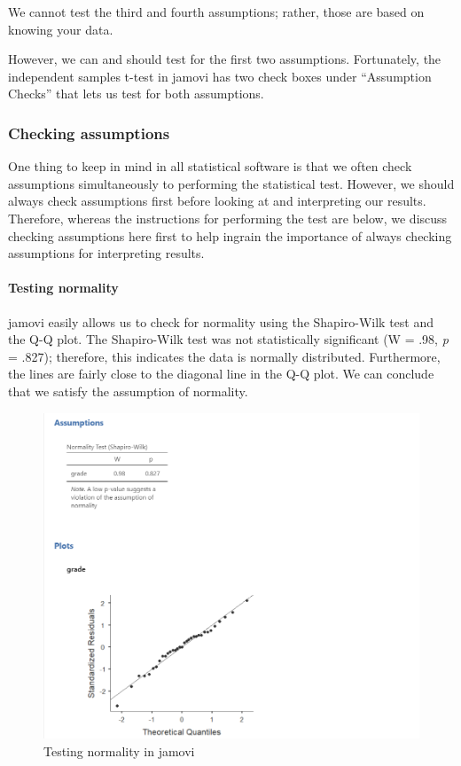 \documentclass[
]{book}
\begin{document}
We cannot test the third and fourth assumptions; rather, those are based on knowing your data.

However, we can and should test for the first two assumptions. Fortunately, the independent samples t-test in jamovi has two check boxes under ``Assumption Checks'' that lets us test for both assumptions.

\hypertarget{checking-assumptions-2}{%
\subsubsection{Checking assumptions}\label{checking-assumptions-2}}

One thing to keep in mind in all statistical software is that we often check assumptions simultaneously to performing the statistical test. However, we should always check assumptions first before looking at and interpreting our results. Therefore, whereas the instructions for performing the test are below, we discuss checking assumptions here first to help ingrain the importance of always checking assumptions for interpreting results.

\hypertarget{testing-normality-1}{%
\paragraph{Testing normality}\label{testing-normality-1}}

jamovi easily allows us to check for normality using the Shapiro-Wilk test and the Q-Q plot. The Shapiro-Wilk test was not statistically significant (W = .98, \emph{p} = .827); therefore, this indicates the data is normally distributed. Furthermore, the lines are fairly close to the diagonal line in the Q-Q plot. We can conclude that we satisfy the assumption of normality.

\begin{figure}

{\centering \includegraphics[width=1\linewidth]{images/02-independent_t-test/independent_t-test_normality} 

}

\caption{Testing normality in jamovi}\label{fig:unnamed-chunk-4}
\end{figure}
\end{document}
